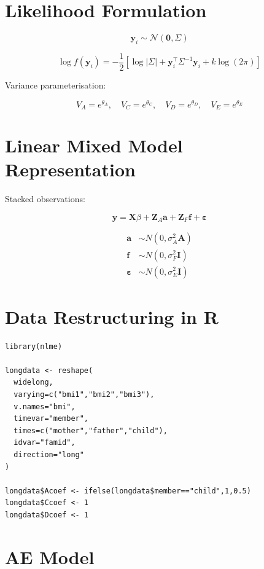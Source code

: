 \documentclass[12pt]{article}
\begin{document}
\section{Likelihood Formulation}

\[
\mathbf{y}_i \sim \mathcal{N}(\mathbf{0}, \Sigma)
\]

\[
\log f(\mathbf{y}_i) =
-\frac12\left[
\log|\Sigma|
+ \mathbf{y}_i^\top \Sigma^{-1} \mathbf{y}_i
+ k\log(2\pi)
\right]
\]

Variance parameterisation:

\[
V_A = e^{\theta_A}, \quad
V_C = e^{\theta_C}, \quad
V_D = e^{\theta_D}, \quad
V_E = e^{\theta_E}
\]

\section{Linear Mixed Model Representation}

Stacked observations:

\[
\mathbf{y} = \mathbf{X}\beta + \mathbf{Z}_A \mathbf{a}
+ \mathbf{Z}_F \mathbf{f} + \boldsymbol{\varepsilon}
\]

\begin{align}
\mathbf{a} &\sim N(0, \sigma_A^2 \mathbf{A}) \\
\mathbf{f} &\sim N(0, \sigma_F^2 \mathbf{I}) \\
\boldsymbol{\varepsilon} &\sim N(0, \sigma_E^2 \mathbf{I})
\end{align}

\section{Data Restructuring in R}

\begin{verbatim}
library(nlme)

longdata <- reshape(
  widelong,
  varying=c("bmi1","bmi2","bmi3"),
  v.names="bmi",
  timevar="member",
  times=c("mother","father","child"),
  idvar="famid",
  direction="long"
)

longdata$Acoef <- ifelse(longdata$member=="child",1,0.5)
longdata$Ccoef <- 1
longdata$Dcoef <- 1
\end{verbatim}

\section{AE Model}
\end{document}
